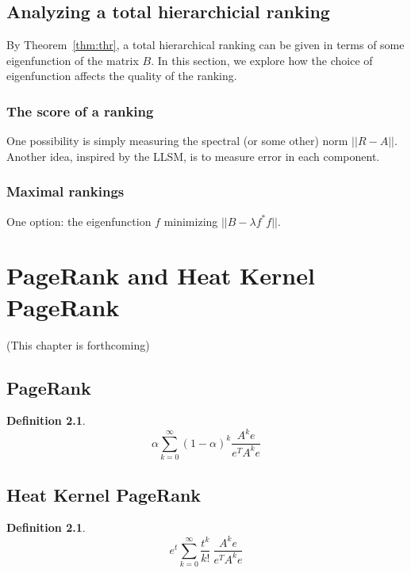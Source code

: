 \documentclass[a4,11pt,twoside,leqno]{report}
\theoremstyle{definition}
\newtheorem{defn}[thm]{Definition}
\theoremstyle{remark}
\numberwithin{equation}{section}
\begin{document}
\section{Analyzing a total hierarchicial ranking}

By Theorem~\ref{thm:thr}, a total hierarchical ranking can be given in terms of
some eigenfunction of the matrix $B$.  In this section, we explore how the
choice of eigenfunction affects the quality of the ranking.

\subsection{The score of a ranking}

One possibility is simply measuring the spectral (or some other) norm $||R-A||$.
Another idea, inspired by the LLSM, is to measure error in each component.  

\subsection{Maximal rankings}

One option: the eigenfunction $f$ minimizing $||B - \lambda f^* f||$.

\chapter{PageRank and Heat Kernel PageRank}

(This chapter is forthcoming)

\section{PageRank}

\begin{defn}

$$\alpha \displaystyle \sum_{k=0}^{\infty} (1-\alpha)^k \frac{A^ke}{e^TA^ke}$$

\end{defn}

\section{Heat Kernel PageRank}

\begin{defn} 

$$e^t \displaystyle \sum_{k=0}^{\infty} \frac{t^k}{k!} \ \frac{A^ke}{e^TA^ke}$$

\end{defn}
\end{document}
